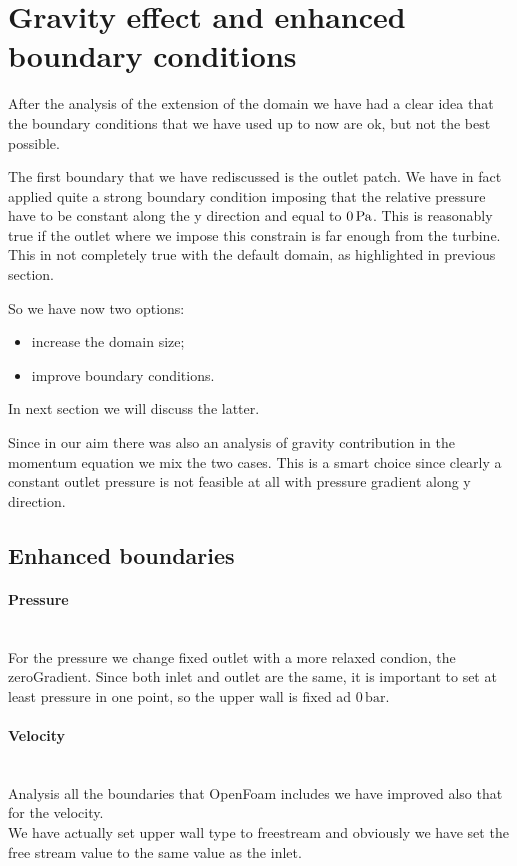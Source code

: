 \documentclass[a4paper,12pt]{article}
\begin{document}
\section{Gravity effect and enhanced boundary conditions}

After the analysis of the extension of the domain we have had a clear idea that the boundary conditions that we have used up to now are ok, 
but not the best possible.

The first boundary that we have rediscussed is the outlet patch. We have in fact applied quite a strong boundary condition imposing that the relative pressure have to be constant along the y direction and equal to $0\,\text{Pa}$. This is reasonably true if the outlet where we impose this constrain is far enough from the turbine. This in not completely true with the default domain, as highlighted in previous section.

So we have now two options:
\begin{itemize}
\item increase the domain size;
\item improve boundary conditions.
\end{itemize}  
In next section we will discuss the latter.

Since in our aim there was also an analysis of gravity contribution in the momentum equation we mix the two cases.
This is a smart choice since clearly a constant outlet pressure is not feasible at all with pressure gradient along y direction.

\subsection{Enhanced boundaries}

\paragraph{Pressure} \mbox{}\\
For the pressure we change fixed outlet with a more relaxed condion, the zeroGradient.
Since both inlet and outlet are the same, it is important to set at least pressure in one point, so the upper wall is fixed ad $0\,\text{bar}$.

\paragraph{Velocity} \mbox{}\\
Analysis all the boundaries that OpenFoam includes we have improved also that for the velocity.\\
We have actually set upper wall type to freestream and obviously we have set the free stream value to the same value as the inlet.
\end{document}
